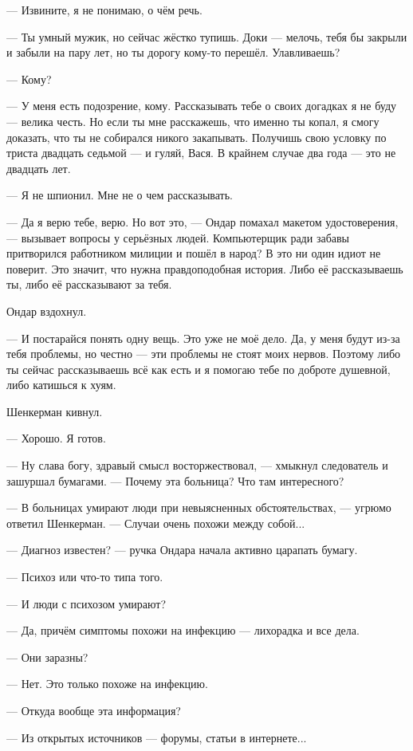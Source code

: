 \documentclass[a4paper,10pt,fleqn]{book}\usepackage{polyglossia}\setdefaultlanguage{english}\setotherlanguage{russian}\defaultfontfeatures{Ligatures=TeX,Mapping=tex-text} \usepackage{xcolor}\definecolor{lightgray}{HTML}{bbbbbb}\color{lightgray}\newcommand{\ml}[3]{\textcolor{black}{#3}}
\begin{document}
--- Извините, я не понимаю, о чём речь.

--- Ты умный мужик, но сейчас жёстко тупишь.
Доки --- мелочь, тебя бы закрыли и забыли на пару лет, но ты дорогу кому-то перешёл.
Улавливаешь?

--- Кому?

--- У меня есть подозрение, кому.
Рассказывать тебе о своих догадках я не буду --- велика честь.
Но если ты мне расскажешь, что именно ты копал, я смогу доказать, что ты не собирался никого закапывать.
Получишь свою условку по триста двадцать седьмой --- и гуляй, Вася.
В крайнем случае два года --- это не двадцать лет.

--- Я не шпионил.
Мне не о чем рассказывать.

--- Да я верю тебе, верю.
Но вот это, --- Ондар помахал макетом удостоверения, --- вызывает вопросы у серьёзных людей.
Компьютерщик ради забавы притворился работником милиции и пошёл в народ?
В это ни один идиот не поверит.
Это значит, что нужна правдоподобная история.
Либо её рассказываешь ты, либо её рассказывают за тебя.

Ондар вздохнул.

--- И постарайся понять одну вещь.
Это уже не моё дело.
Да, у меня будут из-за тебя проблемы, но честно --- эти проблемы не стоят моих нервов.
Поэтому либо ты сейчас рассказываешь всё как есть и я помогаю тебе по доброте душевной, либо катишься к хуям.

Шенкерман кивнул.

--- Хорошо.
Я готов.

--- Ну слава богу, здравый смысл восторжествовал, --- хмыкнул следователь и зашуршал бумагами.
--- Почему эта больница?
Что там интересного?

--- В больницах умирают люди при невыясненных обстоятельствах, --- угрюмо ответил Шенкерман.
--- Случаи очень похожи между собой...

--- Диагноз известен? --- ручка Ондара начала активно царапать бумагу.

--- Психоз или что-то типа того.

--- И люди с психозом умирают?

--- Да, причём симптомы похожи на инфекцию --- лихорадка и все дела.

--- Они заразны?

--- Нет.
Это только похоже на инфекцию.

--- Откуда вообще эта информация?

--- Из открытых источников --- форумы, статьи в интернете...
\end{document}
